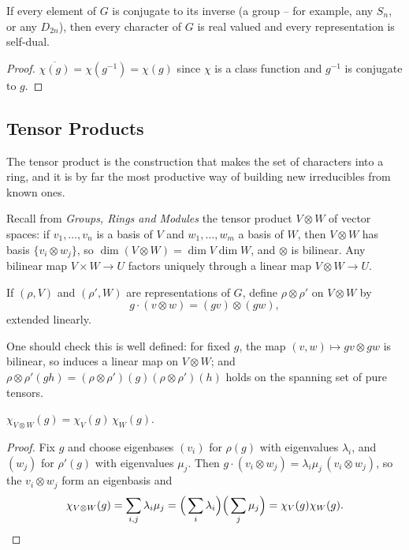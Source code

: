 \documentclass[a4paper]{scrartcl}
\begin{document}
\begin{proposition}
	If every element of $G$ is conjugate to its inverse (a  group -- for example, any $S_n$, or any $D_{2n}$), then every character of $G$ is real valued and every representation is self-dual.
\end{proposition}
\begin{proof}
	$\overline{\chi(g)} = \chi(g^{-1}) = \chi(g)$ since $\chi$ is a class function and $g^{-1}$ is conjugate to $g$.
\end{proof}

\subsection{Tensor Products}

The tensor product is the construction that makes the set of characters into a ring, and it is by far the most productive way of building new irreducibles from known ones.

Recall from \emph{Groups, Rings and Modules} the tensor product $V \otimes W$ of vector spaces: if $v_1,\dots,v_n$ is a basis of $V$ and $w_1,\dots,w_m$ a basis of $W$, then $V\otimes W$ has basis $\{v_i\otimes w_j\}$, so $\dim(V\otimes W) = \dim V\dim W$, and $\otimes$ is bilinear. Any bilinear map $V \times W \to U$ factors uniquely through a linear map $V \otimes W \to U$.

\begin{definition}
	If $(\rho, V)$ and $(\rho', W)$ are representations of $G$, define $\rho\otimes\rho'$ on $V\otimes W$ by
	$$g\cdot(v\otimes w) = (gv)\otimes(gw),$$
	extended linearly.
\end{definition}

One should check this is well defined: for fixed $g$, the map $(v,w)\mapsto gv\otimes gw$ is bilinear, so induces a linear map on $V \otimes W$; and $\rho\otimes\rho'(gh) = (\rho\otimes\rho')(g)(\rho\otimes\rho')(h)$ holds on the spanning set of pure tensors.

\begin{proposition}
	$\chi_{V\otimes W}(g) = \chi_V(g)\,\chi_W(g)$.
\end{proposition}
\begin{proof}
	Fix $g$ and choose eigenbases $(v_i)$ for $\rho(g)$ with eigenvalues $\lambda_i$, and $(w_j)$ for $\rho'(g)$ with eigenvalues $\mu_j$. Then $g\cdot(v_i\otimes w_j) = \lambda_i\mu_j\,(v_i\otimes w_j)$, so the $v_i\otimes w_j$ form an eigenbasis and
	$$\chi_{V\otimes W}(g) = \sum_{i,j}\lambda_i\mu_j = \Big(\sum_i\lambda_i\Big)\Big(\sum_j\mu_j\Big) = \chi_V(g)\chi_W(g). \qedhere$$
\end{proof}
\end{document}
